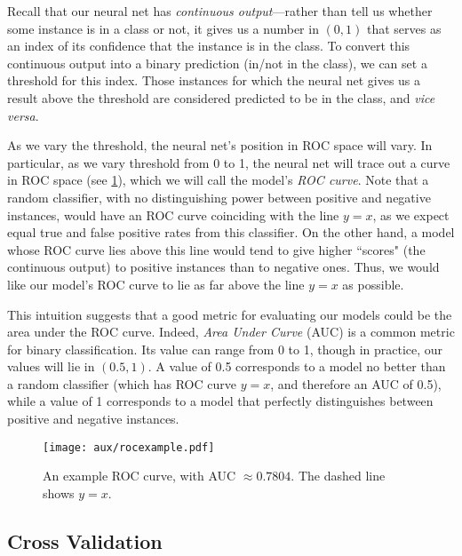 \documentclass[10pt]{article}
\begin{document}
Recall that our neural net has \emph{continuous output}---rather than tell us whether some instance is in a class or not, it gives us a number in $(0, 1)$ that serves as an index of its confidence that the instance is in the class.
To convert this continuous output into a binary prediction (in/not in the class), we can set a threshold for this index.
Those instances for which the neural net gives us a result above the threshold are considered predicted to be in the class, and \emph{vice versa}.

As we vary the threshold, the neural net's position in ROC space will vary.
In particular, as we vary threshold from 0 to 1, the neural net will trace out a curve in ROC space (see \cref{fig:rocexample}), which we will call the model's \emph{ROC curve}.
Note that a random classifier, with no distinguishing power between positive and negative instances, would have an ROC curve coinciding with the line $y = x$, as we expect equal true and false positive rates from this classifier.
On the other hand, a model whose ROC curve lies above this line would tend to give higher ``scores" (the continuous output) to positive instances than to negative ones.
Thus, we would like our model's ROC curve to lie as far above the line $y = x$ as possible.

This intuition suggests that a good metric for evaluating our models could be the area under the ROC curve.
Indeed, \emph{Area Under Curve} (AUC) is a common metric for binary classification.
Its value can range from 0 to 1, though in practice, our values will lie in $(0.5, 1)$.
A value of 0.5 corresponds to a model no better than a random classifier (which has ROC curve $y = x$, and therefore an AUC of 0.5), while a value of 1 corresponds to a model that perfectly distinguishes between positive and negative instances.

\begin{figure}
\centering
\texttt{[image: aux/rocexample.pdf]}
\caption{An example ROC curve, with AUC $\approx 0.7804$. The dashed line shows $y = x$.}
\label{fig:rocexample}
\end{figure}

\subsection{Cross Validation}



%
\end{document}
